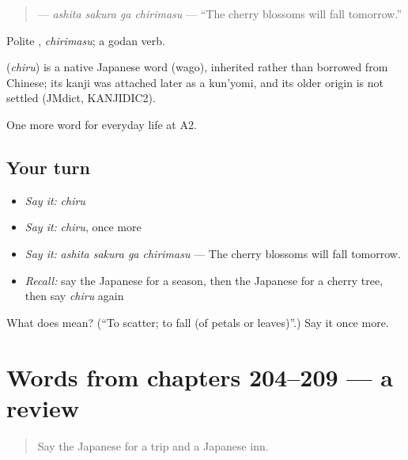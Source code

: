\begin{quote}
\textbf{  } — \emph{ashita sakura ga chirimasu} — \textquotedblleft{}The cherry blossoms will fall tomorrow.\textquotedblright{}
\end{quote}

Polite \textbf{}, \emph{chirimasu}; a godan verb.

\begin{cousinweb}
\textbf{} (\emph{chiru}) is a native Japanese word (wago), inherited rather than borrowed from Chinese; its kanji was attached later as a kun'yomi, and its older origin is not settled (JMdict, KANJIDIC2).
\end{cousinweb}

\begin{grammarlens}[title={What you've built}]
One more word for everyday life at A2.
\end{grammarlens}

\subsection*{Your turn}
\begin{itemize}
\raggedright
  \item \emph{Say it:} \emph{chiru}
  \item \emph{Say it:} \emph{chiru}, once more
  \item \emph{Say it:} \emph{ashita sakura ga chirimasu} — The cherry blossoms will fall tomorrow.
  \item \emph{Recall:} say the Japanese for a season, then the Japanese for a cherry tree, then say \emph{chiru} again
\end{itemize}

\begin{tcolorbox}[breakable,colback=teal!4,colframe=teal!35!black,title={Before you move on}]
What does  mean? (\textquotedblleft{}To scatter; to fall (of petals or leaves)\textquotedblright{}.) Say it once more.
\end{tcolorbox}
\section[(dialogue)]{Words from chapters 204–209 — a review}

\label{lesson:JA-R209-review-204-209}



\begin{quote}
Say the Japanese for a trip and a Japanese inn.
\end{quote}


